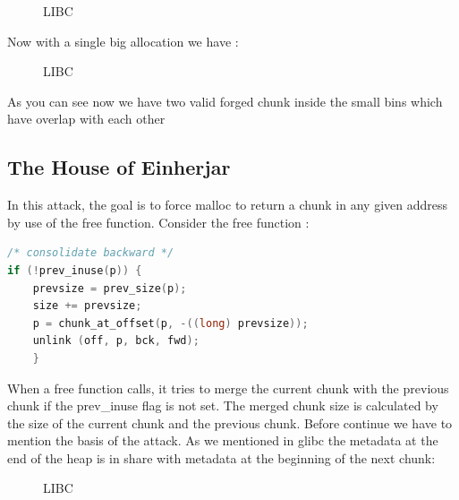 \documentclass{masterthesis}
\newcommand*\libc{glibc}
\newcommand*\sbs{small bins}
\begin{document}
\begin{figure}[h!]
  \caption{LIBC}
\end{figure}

Now with a single big allocation we have :
\begin{figure}[h!]
  \caption{LIBC}
\end{figure}

As you can see now we have two valid forged chunk inside the \sbs{} which have overlap with each other

\subsection{The House of Einherjar}
In this attack, the goal is to force malloc to return a chunk in any given address by use of the free function. Consider the free function :
\begin{lstlisting}[language=c,frame=tlrb]
/* consolidate backward */
if (!prev_inuse(p)) {
    prevsize = prev_size(p);
    size += prevsize;
    p = chunk_at_offset(p, -((long) prevsize));
	unlink (off, p, bck, fwd);
	} 
 \end{lstlisting}
When a free function calls, it tries to merge the current chunk with the previous chunk if the prev\_inuse flag is not set. The merged chunk size is calculated by the size of the current chunk and the previous chunk. Before continue we have to mention the basis of the attack. As we mentioned in \libc{} the metadata at the end of the heap is in share with metadata at the beginning of the next chunk: 
\begin{figure}[h!]
  \caption{LIBC}
\end{figure}
\end{document}
